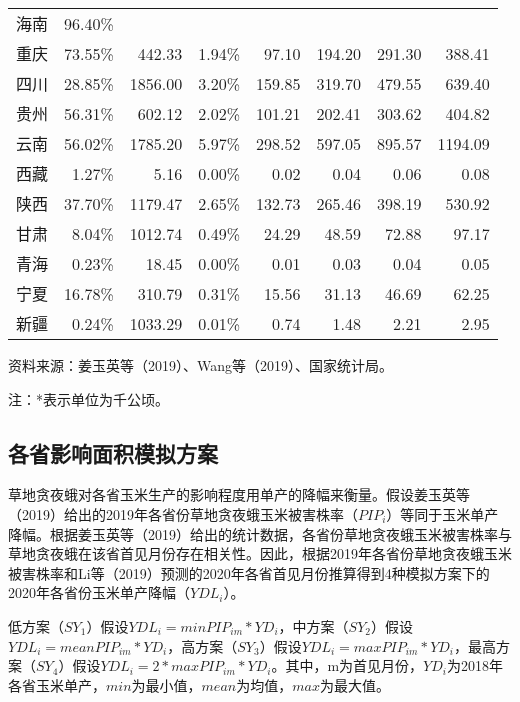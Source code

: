 \documentclass{progbookcn}
\begin{document}
\begin{table}[]
\begin{threeparttable}
\begin{tabular}{lrrrrrrr}
海南	&96.40\%	&			&		&		&		&		&	\\
重庆	&73.55\%	&442.33		&1.94\%	&97.10 	&194.20 &291.30 &388.41 \\
四川	&28.85\%	&1856.00	&3.20\%	&159.85 &319.70 &479.55 &639.40 \\
贵州	&56.31\%	&602.12		&2.02\%	&101.21 &202.41 &303.62 &404.82 \\
云南	&56.02\%	&1785.20	&5.97\%	&298.52 &597.05 &895.57 &1194.09 \\
西藏	&1.27\%		&5.16		&0.00\%	&0.02 	&0.04 	&0.06 	&0.08 \\
陕西	&37.70\%	&1179.47	&2.65\%	&132.73 &265.46 &398.19 &530.92 \\
甘肃	&8.04\%		&1012.74	&0.49\%	&24.29 	&48.59 	&72.88 	&97.17 \\
青海	&0.23\%		&18.45		&0.00\%	&0.01 	&0.03 	&0.04 	&0.05 \\
宁夏	&16.78\%	&310.79		&0.31\%	&15.56 	&31.13 	&46.69 	&62.25 \\
新疆	&0.24\%		&1033.29	&0.01\%	&0.74 	&1.48 	&2.21 	&2.95 \\
\hline
\end{tabular}
\begin{tablenotes}
\item \tiny{资料来源：姜玉英等（2019）、Wang等（2019）、国家统计局。}
\item \tiny{注：*表示单位为千公顷。}
\end{tablenotes}
\end{threeparttable}
\end{table}

\subsection{各省影响面积模拟方案}

草地贪夜蛾对各省玉米生产的影响程度用单产的降幅来衡量。假设姜玉英等（2019）给出的2019年各省份草地贪夜蛾玉米被害株率（$PIP_i$）等同于玉米单产降幅。根据姜玉英等（2019）给出的统计数据，各省份草地贪夜蛾玉米被害株率与草地贪夜蛾在该省首见月份存在相关性。因此，根据2019年各省份草地贪夜蛾玉米被害株率和Li等（2019）预测的2020年各省首见月份推算得到4种模拟方案下的2020年各省份玉米单产降幅（$YDL_i$）。

低方案（$SY_1$）假设$YDL_i=minPIP_{im}*YD_i$，中方案（$SY_2$）假设$YDL_i=meanPIP_{im}*YD_i$，高方案（$SY_3$）假设$YDL_i=maxPIP_{im}*YD_i$，最高方案（$SY_4$）假设$YDL_i=2*maxPIP_{im}*YD_i$。其中，m为首见月份，$YD_i$为2018年各省玉米单产，$min$为最小值，$mean$为均值，$max$为最大值。
\end{document}
